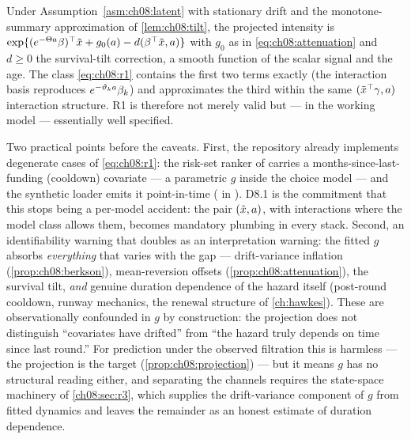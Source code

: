 \begin{corollary}
\label{cor:ch08:r1exact}
Under Assumption~\ref{asm:ch08:latent} with stationary drift and the
monotone-summary approximation of \cref{lem:ch08:tilt}, the projected
intensity is
$\exp\{(e^{-\Theta a}\beta)^{\top}\tilde x + g_0(a) - d(\beta^{\top}\tilde x,
a)\}$ with $g_0$ as in \cref{eq:ch08:attenuation} and $d \ge 0$ the
survival-tilt correction, a smooth function of the scalar signal and the
age. The class \cref{eq:ch08:r1} contains the first two terms exactly
(the interaction basis reproduces $e^{-\vartheta_k a}\beta_k$) and
approximates the third within the same $(\tilde{x}^{\top}\gamma,
a)$ interaction structure. R1 is therefore not merely valid but
--- in the working model --- essentially well specified.
\end{corollary}

Two practical points before the caveats. First, the repository already
implements degenerate cases of \cref{eq:ch08:r1}: the risk-set ranker of
 carries a months-since-last-funding
(cooldown) covariate --- a parametric $g$ inside the choice model --- and
the synthetic loader emits it point-in-time
( in ).
D8.1 is the commitment that this stops being a per-model accident: the
pair $(\tilde{x}, a)$, with interactions where the model class
allows them, becomes mandatory plumbing in every stack. Second, an
identifiability warning that doubles as an interpretation warning: the
fitted $g$ absorbs \emph{everything} that varies with the gap ---
drift-variance inflation (\cref{prop:ch08:berkson}), mean-reversion
offsets (\cref{prop:ch08:attenuation}), the survival tilt, \emph{and}
genuine duration dependence of the hazard itself (post-round cooldown,
runway mechanics, the renewal structure of \cref{ch:hawkes}). These are
observationally confounded in $g$ by construction: the projection does
not distinguish ``covariates have drifted'' from ``the hazard truly
depends on time since last round.'' For prediction under the observed
filtration this is harmless --- the projection is the target
(\cref{prop:ch08:projection}) --- but it means $g$ has no structural
reading either, and separating the channels requires the state-space
machinery of \cref{ch08:sec:r3}, which supplies the drift-variance
component of $g$ from fitted dynamics and leaves the remainder as an
honest estimate of duration dependence.

